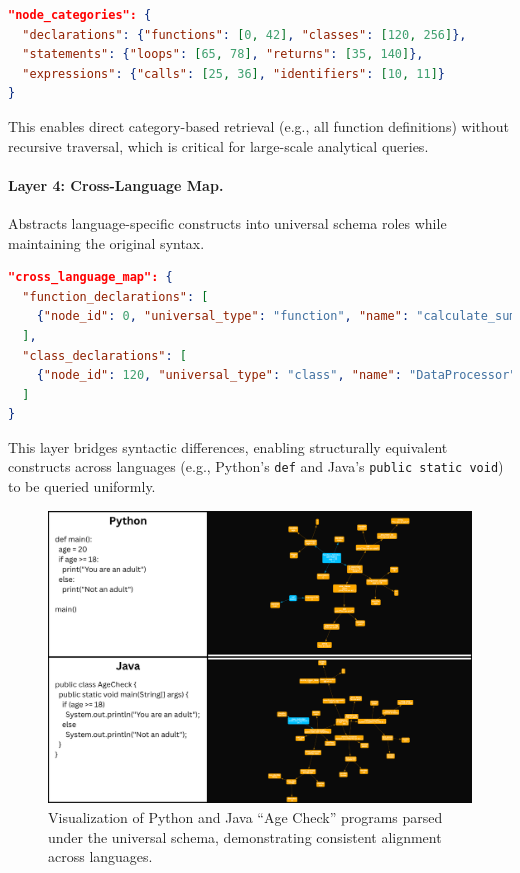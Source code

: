 \documentclass{article}
\begin{document}
\begin{lstlisting}[language=json,caption={Categorical indexing of declarations, statements, and expressions.}]
"node_categories": {
  "declarations": {"functions": [0, 42], "classes": [120, 256]},
  "statements": {"loops": [65, 78], "returns": [35, 140]},
  "expressions": {"calls": [25, 36], "identifiers": [10, 11]}
}
\end{lstlisting}

This enables direct category-based retrieval (e.g., all function definitions) without recursive traversal, which is critical for large-scale analytical queries.

\paragraph{Layer 4: Cross-Language Map.}  
Abstracts language-specific constructs into universal schema roles while maintaining the original syntax.

\begin{lstlisting}[language=json,caption={Cross-language normalization of function and class declarations.}]
"cross_language_map": {
  "function_declarations": [
    {"node_id": 0, "universal_type": "function", "name": "calculate_sum"}
  ],
  "class_declarations": [
    {"node_id": 120, "universal_type": "class", "name": "DataProcessor"}
  ]
}
\end{lstlisting}

This layer bridges syntactic differences, enabling structurally equivalent constructs across languages (e.g., Python’s \texttt{def} and Java’s \texttt{public static void}) to be queried uniformly.

\begin{figure}[H]
\centering
\includegraphics[width=\linewidth]{pythoncode_and_schema_vs_javacode_and_schema.png}
\caption{Visualization of Python and Java ``Age Check'' programs parsed under the universal schema, demonstrating consistent alignment across languages.}
\label{fig:python-java-agecheck}
\end{figure}
\end{document}
